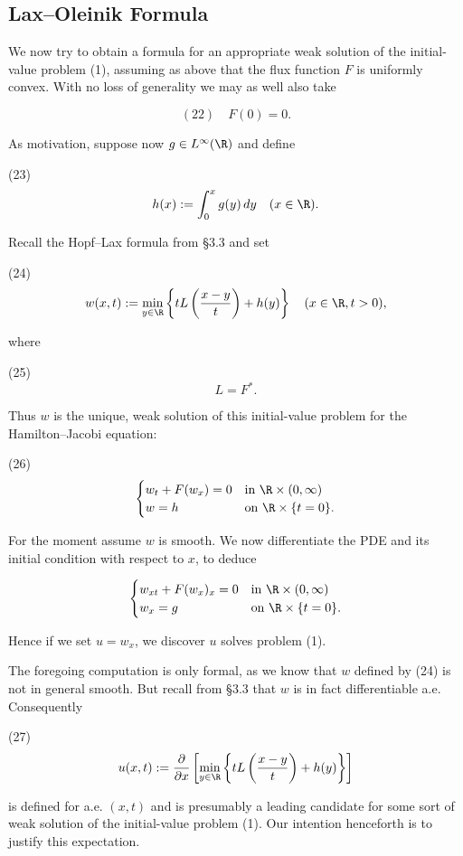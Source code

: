 \subsection{Lax--Oleinik Formula}
\label{sec:lax-oleinik-formula}

We now try to obtain a formula for an appropriate weak solution of the initial-value problem (1), assuming as above that the flux function $F$ is uniformly convex. With no loss of generality we may as well also take

$$(22) \quad F(0) = 0.$$

As motivation, suppose now $g \in L^\infty(\R)$ and define

(23)
$$h(x) := \int_0^x g(y) \, dy \quad (x \in \R).$$

Recall the Hopf--Lax formula from \S3.3 and set

(24)
$$w(x,t) := \min_{y \in \R} \left\{ tL\left(\frac{x-y}{t}\right) + h(y) \right\} \quad (x \in \R, t > 0),$$

where

(25)
$$L = F^*.$$

Thus $w$ is the unique, weak solution of this initial-value problem for the Hamilton--Jacobi equation:

(26)
$$\begin{cases}
w_t + F(w_x) = 0 & \text{in } \R \times (0,\infty) \\
w = h & \text{on } \R \times \{t = 0\}.
\end{cases}$$

For the moment assume $w$ is smooth. We now differentiate the PDE and its initial condition with respect to $x$, to deduce

$$\begin{cases}
w_{xt} + F(w_x)_x = 0 & \text{in } \R \times (0,\infty) \\
w_x = g & \text{on } \R \times \{t = 0\}.
\end{cases}$$

Hence if we set $u = w_x$, we discover $u$ solves problem (1).

The foregoing computation is only formal, as we know that $w$ defined by (24) is not in general smooth. But recall from \S3.3 that $w$ is in fact differentiable a.e. Consequently

(27)
$$u(x,t) := \frac{\partial}{\partial x} \left[ \min_{y \in \R} \left\{ tL\left(\frac{x-y}{t}\right) + h(y) \right\} \right]$$

is defined for a.e. $(x,t)$ and is presumably a leading candidate for some sort of weak solution of the initial-value problem (1). Our intention henceforth is to justify this expectation.

